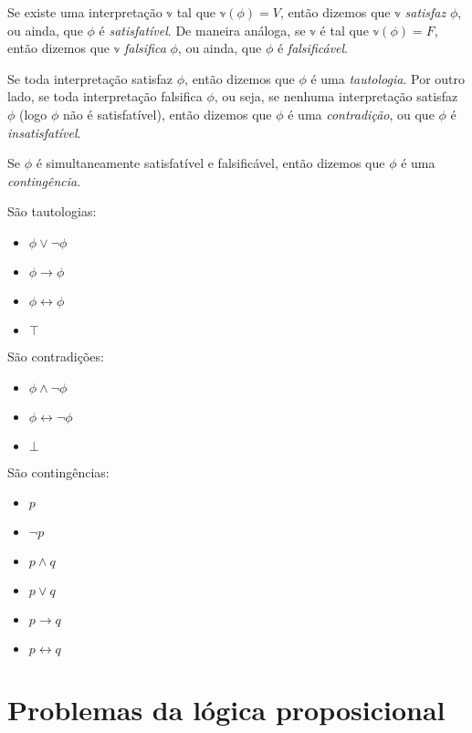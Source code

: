 \begin{definition}
	Se existe uma interpretação $\mathbb{v}$ tal que $\mathbb{v}(\phi) = V$, então dizemos que $\mathbb{v}$ \emph{satisfaz} $\phi$, ou ainda, que $\phi$ é \emph{satisfatível}. De maneira análoga, se $\mathbb{v}$ é tal que $\mathbb{v}(\phi) = F$, então dizemos que $\mathbb{v}$ \emph{falsifica} $\phi$, ou ainda, que $\phi$ é \emph{falsificável}.
	
	Se toda interpretação satisfaz $\phi$, então dizemos que $\phi$ é uma \emph{tautologia}. Por outro lado, se toda interpretação falsifica $\phi$, ou seja, se nenhuma interpretação satisfaz $\phi$ (logo $\phi$ não é satisfatível), então dizemos que $\phi$ é uma \emph{contradição}, ou que $\phi$ é \emph{insatisfatível}.
	
	Se $\phi$ é simultaneamente satisfatível e falsificável, então dizemos que $\phi$ é uma \emph{contingência}.
\end{definition}

\begin{example}
    São tautologias:
    \begin{itemize}
        \item $\phi \vee \neg \phi$
        \item $\phi \rightarrow \phi$
        \item $\phi \leftrightarrow \phi$
        \item $\top$
    \end{itemize}
    São contradições:
    \begin{itemize}
        \item $\phi \wedge \neg \phi$
        \item $\phi \leftrightarrow \neg \phi$
        \item $\bot$
    \end{itemize}
    São contingências:
    \begin{itemize}
    	\item $p$
    	\item $\neg p$
    	\item $p \wedge q$
    	\item $p \vee q$
    	\item $p \rightarrow q$
    	\item $p \leftrightarrow q$
    \end{itemize}
\end{example}

\section{Problemas da lógica proposicional}
\label{problemas_da_logica}

